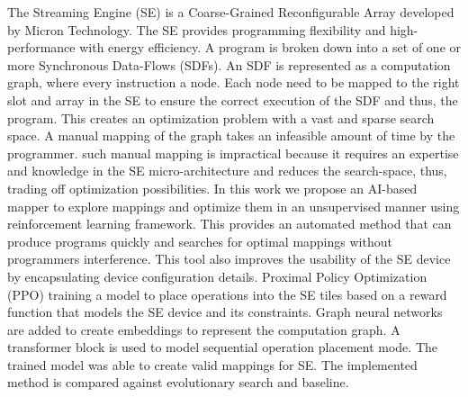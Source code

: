 The Streaming Engine (SE) is a Coarse-Grained Reconfigurable Array developed by Micron 
Technology.
The SE provides programming flexibility and high-performance with energy efficiency.
A program is broken down into a set of one or more Synchronous Data-Flows (SDFs).
An SDF is represented as a computation graph, where every instruction a node.
Each node need to be mapped to the right slot and array in the SE to ensure the correct execution of the SDF and thus, the program.
This creates an optimization problem with a vast and sparse search space.
A manual mapping of the graph takes an infeasible amount of time by the programmer.
such manual mapping is impractical because it requires an expertise and knowledge in the SE micro-architecture and reduces the search-space, thus, trading off optimization possibilities.
In this work we propose an AI-based mapper to explore mappings and optimize them in an unsupervised manner using reinforcement learning framework.
This provides an automated method that can produce programs quickly and searches for optimal mappings without programmers interference. 
This tool also improves the usability of the SE device by encapsulating device configuration details.
Proximal Policy Optimization (PPO) training a model to place operations into the SE tiles based on a reward function that models the SE device and its constraints.
Graph neural networks are added to create embeddings to represent the computation graph.
A transformer block is used to model sequential operation placement mode. 
The trained model was able to create valid mappings for SE.
The implemented method is compared against evolutionary search and baseline.
